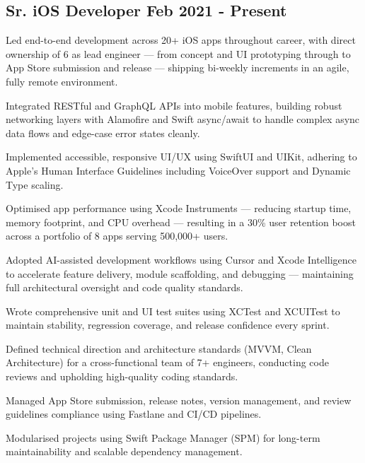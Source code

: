 \subsection{\texorpdfstring{Sr. iOS Developer \hfill Feb 2021 - Present}{Sr. iOS Developer (Feb 2021 - Present)}}
\begin{zitemize}
    \item Led end-to-end development across 20+ iOS apps throughout career, with direct ownership of 6 as lead engineer --- from concept and UI prototyping through to App Store submission and release --- shipping bi-weekly increments in an agile, fully remote environment.
    \item Integrated RESTful and GraphQL APIs into mobile features, building robust networking layers with Alamofire and Swift async/await to handle complex async data flows and edge-case error states cleanly.
    \item Implemented accessible, responsive UI/UX using SwiftUI and UIKit, adhering to Apple's Human Interface Guidelines including VoiceOver support and Dynamic Type scaling.
    \item Optimised app performance using Xcode Instruments --- reducing startup time, memory footprint, and CPU overhead --- resulting in a 30\% user retention boost across a portfolio of 8 apps serving 500,000+ users.
    \item Adopted AI-assisted development workflows using Cursor and Xcode Intelligence to accelerate feature delivery, module scaffolding, and debugging — maintaining full architectural oversight and code quality standards.
    \item Wrote comprehensive unit and UI test suites using XCTest and XCUITest to maintain stability, regression coverage, and release confidence every sprint.
    \item Defined technical direction and architecture standards (MVVM, Clean Architecture) for a cross-functional team of 7+ engineers, conducting code reviews and upholding high-quality coding standards.
    \item Managed App Store submission, release notes, version management, and review guidelines compliance using Fastlane and CI/CD pipelines.
    \item Modularised projects using Swift Package Manager (SPM) for long-term maintainability and scalable dependency management.
\end{zitemize}

